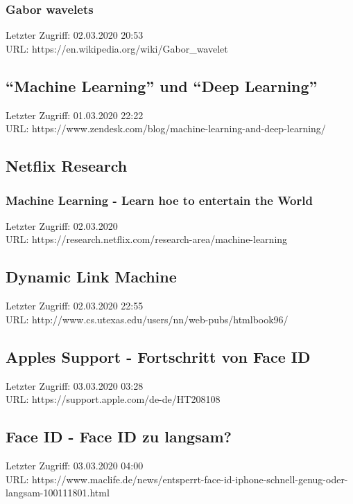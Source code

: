 	\subsubsection{Gabor wavelets}
	\label{Gabor_wavelets}
	Letzter Zugriff: 02.03.2020 20:53\\
	URL: https://en.wikipedia.org/wiki/Gabor\_wavelet

\subsection{\enquote{Machine Learning} und \enquote{Deep Learning}}
\label{subsec:machine_learning_and_deep_learning}
	Letzter Zugriff: 01.03.2020 22:22\\
	URL: https://www.zendesk.com/blog/machine-learning-and-deep-learning/

\subsection{Netflix Research}
\label{Netlfix_Research}
	\subsubsection{Machine Learning - Learn hoe to entertain the World}
	\label{Netflix_Research:machine_learning_learn_how_to_entertain_the_world}
	Letzter Zugriff: 02.03.2020\\
	URL: https://research.netflix.com/research-area/machine-learning

\subsection{Dynamic Link Machine}
\label{subsec:dynamic_link_machine}
	Letzter Zugriff: 02.03.2020 22:55\\
	URL: http://www.cs.utexas.edu/users/nn/web-pubs/htmlbook96/

\subsection{Apples Support - Fortschritt von Face ID}
\label{apple:face_id}
	Letzter Zugriff: 03.03.2020 03:28\\
	URL: https://support.apple.com/de-de/HT208108

\subsection{Face ID - Face ID zu langsam?}
\label{maclife:face_id_too_slow}
	Letzter Zugriff: 03.03.2020 04:00\\
	URL: https://www.maclife.de/news/entsperrt-face-id-iphone-schnell-genug-oder-langsam-100111801.html

